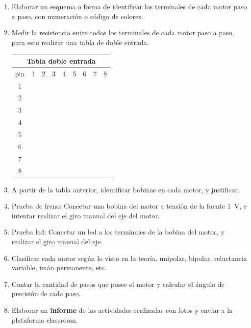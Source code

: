 \documentclass[../main]{subfiles}
\begin{document}
\begin{enumerate}
  \item Elaborar un esquema o forma de identificar los terminales de cada motor paso a paso, con numeración o código de colores.
  \item Medir la resistencia entre todos los terminales de cada motor paso a paso, para esto realizar una tabla de doble entrada.
    \begin{center}
      \begin{tabular}{|c||c|c|c|c|c|c|c|c|}
        \hline
        \multicolumn{9}{|c|}{Tabla doble entrada} \\
        \hline\hline
        pin & 1 & 2 & 3 & 4 & 5 & 6 & 7 & 8 \\
        \hline\hline
        1 & & & & & & & & \\
        \hline
        2 & & & & & & & & \\
        \hline
        3 & & & & & & & & \\
        \hline
        4 & & & & & & & & \\
        \hline
        5 & & & & & & & & \\
        \hline
        6 & & & & & & & & \\
        \hline
        7 & & & & & & & & \\
        \hline
        8 & & & & & & & & \\
        \hline
      \end{tabular}
    \end{center}
  \item A partir de la tabla anterior, identificar bobinas en cada motor, y justificar.
  \item Prueba de freno: Conectar una bobina del motor a tensión de la fuente \qty{1}{V}, e intentar realizar el giro manual del eje del motor.
  \item Prueba led: Conectar un led a los terminales de la bobina del motor, y realizar el giro manual del eje.
  \item Clasificar cada motor según lo visto en la teoría, unipolar, bipolar, reluctancia variable, imán permanente, etc.
  \item Contar la cantidad de pasos que posee el motor y calcular el ángulo de precisión de cada paso.
  \item Elaborar un \textbf{informe} de las actividades realizadas con fotos y enviar a la plataforma classroom.
\end{enumerate}
\end{document}
